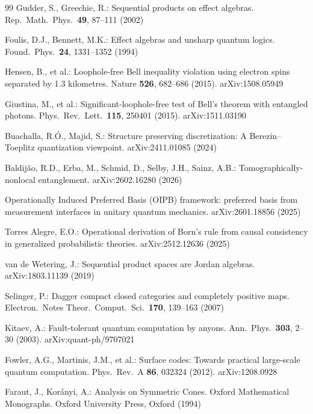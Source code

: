 \documentclass[11pt]{article}
\theoremstyle{remark}
\begin{document}
\begin{thebibliography}{99}
 Gudder, S., Greechie, R.: Sequential products on effect algebras. Rep.\ Math.\ Phys.\ \textbf{49}, 87--111 (2002)

 Foulis, D.J., Bennett, M.K.: Effect algebras and unsharp quantum logics. Found.\ Phys.\ \textbf{24}, 1331--1352 (1994)

 Hensen, B., et al.: Loophole-free Bell inequality violation using electron spins separated by 1.3 kilometres. Nature \textbf{526}, 682--686 (2015). arXiv:1508.05949

 Giustina, M., et al.: Significant-loophole-free test of Bell's theorem with entangled photons. Phys.\ Rev.\ Lett.\ \textbf{115}, 250401 (2015). arXiv:1511.03190

 Buachalla, R.\'O., Majid, S.: Structure preserving discretization: A Berezin--Toeplitz quantization viewpoint. arXiv:2411.01085 (2024)

 Baldij\~ao, R.D., Erba, M., Schmid, D., Selby, J.H., Sainz, A.B.: Tomographically-nonlocal entanglement. arXiv:2602.16280 (2026)

 Operationally Induced Preferred Basis (OIPB) framework: preferred basis from measurement interfaces in unitary quantum mechanics. arXiv:2601.18856 (2025)

 Torres Alegre, E.O.: Operational derivation of Born's rule from causal consistency in generalized probabilistic theories. arXiv:2512.12636 (2025)

 van de Wetering, J.: Sequential product spaces are Jordan algebras. arXiv:1803.11139 (2019)

 Selinger, P.: Dagger compact closed categories and completely positive maps. Electron.\ Notes Theor.\ Comput.\ Sci.\ \textbf{170}, 139--163 (2007)

 Kitaev, A.: Fault-tolerant quantum computation by anyons. Ann.\ Phys.\ \textbf{303}, 2--30 (2003). arXiv:quant-ph/9707021

 Fowler, A.G., Martinis, J.M., et al.: Surface codes: Towards practical large-scale quantum computation. Phys.\ Rev.\ A \textbf{86}, 032324 (2012). arXiv:1208.0928

 Faraut, J., Korányi, A.: Analysis on Symmetric Cones. Oxford Mathematical Monographs. Oxford University Press, Oxford (1994)


\end{thebibliography}
\end{document}
